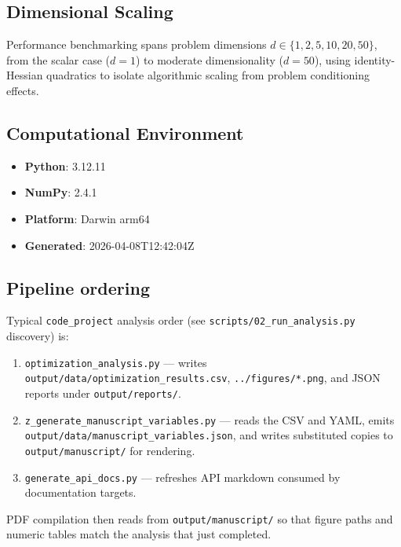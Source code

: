 \documentclass[
]{article}
\providecommand{\tightlist}{%
  \setlength{\itemsep}{0pt}\setlength{\parskip}{0pt}}
\begin{document}
\subsection{Dimensional Scaling}\label{dimensional-scaling}

Performance benchmarking spans problem dimensions
\(d \in \{1, 2, 5, 10, 20, 50\}\), from the scalar case (\(d = 1\)) to
moderate dimensionality (\(d = 50\)), using identity-Hessian quadratics
to isolate algorithmic scaling from problem conditioning effects.

\subsection{Computational Environment}\label{computational-environment}

\begin{itemize}
\tightlist
\item
  \textbf{Python}: 3.12.11
\item
  \textbf{NumPy}: 2.4.1
\item
  \textbf{Platform}: Darwin arm64
\item
  \textbf{Generated}: 2026-04-08T12:42:04Z
\end{itemize}

\subsection{Pipeline ordering}\label{pipeline-ordering}

Typical \texttt{code\_project} analysis order (see
\texttt{scripts/02\_run\_analysis.py} discovery) is:

\begin{enumerate}
\def\labelenumi{\arabic{enumi}.}
\tightlist
\item
  \texttt{optimization\_analysis.py} --- writes
  \texttt{output/data/optimization\_results.csv},
  \texttt{../figures/*.png}, and JSON reports under
  \texttt{output/reports/}.
\item
  \texttt{z\_generate\_manuscript\_variables.py} --- reads the CSV and
  YAML, emits \texttt{output/data/manuscript\_variables.json}, and
  writes substituted copies to \texttt{output/manuscript/} for
  rendering.
\item
  \texttt{generate\_api\_docs.py} --- refreshes API markdown consumed by
  documentation targets.
\end{enumerate}

PDF compilation then reads from \texttt{output/manuscript/} so that
figure paths and numeric tables match the analysis that just completed.
\end{document}

